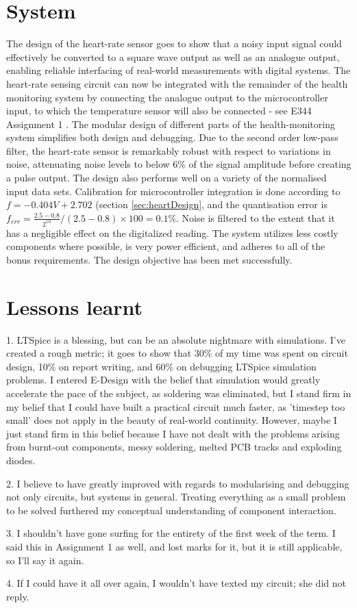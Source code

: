 \section{System}
The design of the heart-rate sensor goes to show that a noisy input signal could effectively be converted to a square wave output as well as an analogue output, enabling reliable interfacing of real-world measurements with digital systems. The heart-rate sensing circuit can now be integrated with the remainder of the health monitoring system by connecting the analogue output to the microcontroller input, to which the temperature sensor will also be connected - see E344 Assignment 1 \cite{prev}. The modular design of different parts of the health-monitoring system simplifies both design and debugging. Due to the second order low-pass filter, the heart-rate sensor is remarkably robust with respect to variations in noise, attenuating noise levels to below 6\% of the signal amplitude before creating a pulse output. The design also performs well on a variety of the normalised input data sets. Calibration for microcontroller integration is done according to $f = -0.404V + 2.702$ (section \ref{sec:heartDesign}, and the quantisation error is $f_{err} = \frac{2.5 - 0.8}{2^{10}} / (2.5 - 0.8) \times 100 = 0.1\%$. Noise is filtered to the extent that it has a negligible effect on the digitalized reading.
The system utilizes less costly components where possible, is very power efficient, and adheres to all of the bonus requirements. The design objective has been met successfully.

\section{Lessons learnt}
1. LTSpice is a blessing, but can be an absolute nightmare with simulations. I've created a rough metric; it goes to show that 30\% of my time was spent on circuit design, 10\% on report writing, and 60\% on debugging LTSpice simulation problems. I entered E-Design with the belief that simulation would greatly accelerate the pace of the subject, as soldering was eliminated, but I stand firm in my belief that I could have built a practical circuit much faster, as 'timestep too small' does not apply in the beauty of real-world continuity. However, maybe I just stand firm in this belief because I have not dealt with the problems arising from burnt-out components, messy soldering, melted PCB tracks and exploding diodes.

2. I believe to have greatly improved with regards to modularising and debugging not only circuits, but systems in general. Treating everything as a small problem to be solved furthered my conceptual understanding of component interaction.

3. I shouldn't have gone surfing for the entirety of the first week of the term. I said this in Assignment 1 as well, and lost marks for it, but it is still applicable, so I'll say it again.

4. If I could have it all over again, I wouldn't have texted my circuit; she did not reply.